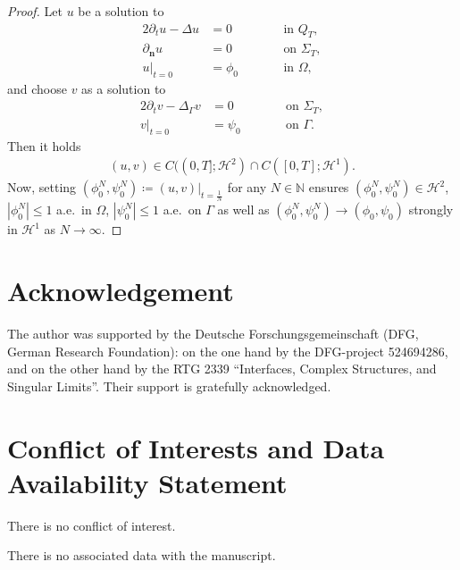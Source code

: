 \documentclass[11pt,reqno]{amsart}
\theoremstyle{remark}
\numberwithin{equation}{section}
\newcommand{\abs}[1]{|#1|}
\newcommand{\N}{\mathbb N}
\newcommand{\n}{\mathbf{n}}
\newcommand{\delt}{\partial_{t}}
\newcommand{\deln}{\partial_\n}
\newcommand{\Lap}{\Delta}
\newcommand{\Lapg}{\Delta_\Ga}
\newcommand{\Om}{\Omega}
\newcommand{\Ga}{\Gamma}
\begin{document}
\begin{proof}
    Let $u$ be a solution to
    \begin{alignat*}{2}
        \delt u - \Lap u &= 0 &&\qquad\text{in~}Q_T, \\
        \deln u &= 0 &&\qquad\text{on~}\Sigma_T, \\
        u\vert_{t=0} &= \phi_0 &&\qquad\text{in~}\Om,
    \end{alignat*}
    and choose $v$ as a solution to 
    \begin{alignat*}{2}
        \delt v - \Lapg v &= 0 &&\qquad\text{on~}\Sigma_T, \\
        v\vert_{t=0} &= \psi_0 &&\qquad\text{on~}\Ga.
    \end{alignat*}
    Then it holds
    \begin{align*}
        (u,v)\in C((0,T];\mathcal{H}^2)\cap C([0,T];\mathcal{H}^1).
    \end{align*}
    Now, setting $(\phi_0^N,\psi_0^N) \coloneqq (u,v)\vert_{t=\frac1N}$ for any $N\in\N$ ensures $(\phi_0^N,\psi_0^N)\in\mathcal{H}^2$, $\abs{\phi_0^N} \leq 1$ a.e.~in $\Om$, $\abs{\psi_0^N} \leq 1$ a.e.~on $\Ga$ as well as $(\phi_0^N,\psi_0^N)\rightarrow (\phi_0,\psi_0)$ strongly in $\mathcal{H}^1$ as $N\rightarrow\infty$.
\end{proof}



\section*{Acknowledgement}
\noindent

The author was supported by the Deutsche Forschungsgemeinschaft (DFG,
German Research Foundation): on the one hand by the DFG-project 524694286, and on the other
hand by the RTG 2339 “Interfaces, Complex Structures, and Singular Limits”. Their support is
gratefully acknowledged.



\section*{Conflict of Interests and Data Availability Statement}

There is no conflict of interest.

There is no associated data with the manuscript.



\end{document}
